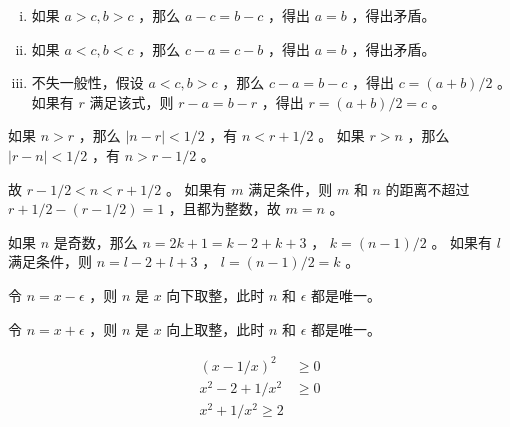 {{        %
        \begin{practices}
            \begin{enumerate}[i.]
                \item
                {
                    如果 $a > c, b > c$ ，那么 $a - c = b - c$ ，得出 $a = b$ ，得出矛盾。
                }
                \item
                {
                    如果 $a < c, b < c$ ，那么 $c - a = c - b$ ，得出 $a = b$ ，得出矛盾。
                }
                \item
                {
                    不失一般性，假设 $a < c, b > c$ ，那么 $c - a = b - c$ ，得出 $c = (a + b) / 2$ 。
                    如果有 $r$ 满足该式，则 $r - a = b - r$ ，得出 $r = (a + b) / 2 = c$ 。
                }
            \end{enumerate}
        \end{practices}

        \begin{practices}
            如果 $n > r$ ，那么 $|n - r| < 1 / 2$ ，有 $n < r + 1 / 2$ 。
            如果 $r > n$ ，那么 $|r - n| < 1 / 2$ ，有 $n > r - 1 / 2$ 。

            故 $r - 1 / 2 < n < r + 1 / 2$ 。
            如果有 $m$ 满足条件，则 $m$ 和 $n$ 的距离不超过 $r + 1 / 2 - (r - 1 / 2) = 1$ ，且都为整数，故 $m = n$ 。
        \end{practices}

        \begin{practices}
            如果 $n$ 是奇数，那么 $n = 2k + 1 = k - 2 + k + 3$ ， $k = (n - 1) / 2$ 。
            如果有 $l$ 满足条件，则 $n = l - 2 + l + 3$ ， $l = (n - 1) / 2 = k$ 。
        \end{practices}

        \begin{practices}
            令 $n = x - \epsilon$ ，则 $n$ 是 $x$ 向下取整，此时 $n$ 和 $\epsilon$ 都是唯一。
        \end{practices}

        \begin{practices}
            令 $n = x + \epsilon$ ，则 $n$ 是 $x$ 向上取整，此时 $n$ 和 $\epsilon$ 都是唯一。
        \end{practices}

        \begin{practices}
            \begin{align*}
                (x - 1 / x)^2 &\geq 0 \\
                x^2 - 2 + 1 / x^2 &\geq 0 \\
                x^2 + 1 / x^2 \geq 2
            \end{align*}
        \end{practices}

}}
